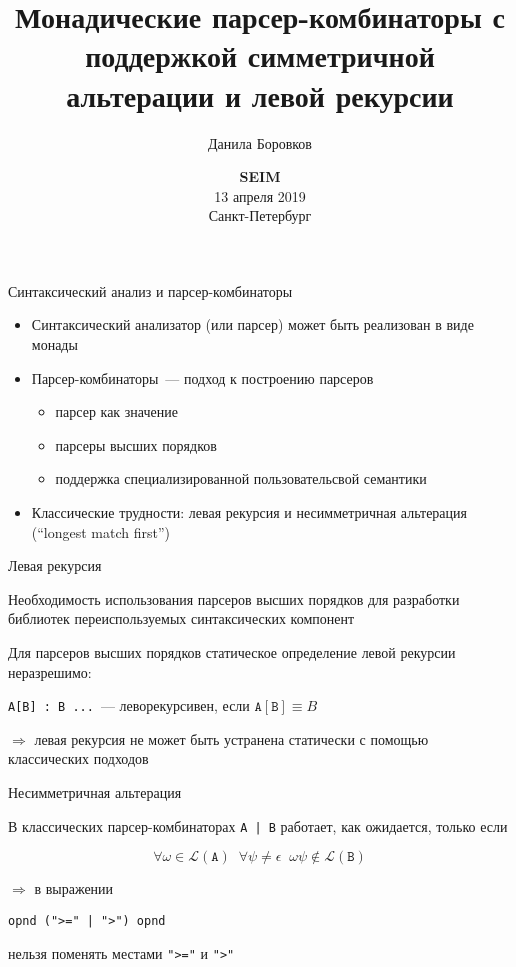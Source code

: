 \documentclass[10pt, mathserif]{beamer}
\title{Монадические парсер-комбинаторы с поддержкой симметричной альтерации и левой рекурсии}
\author{Данила Боровков}
\date{
   \vskip 3cm
   \small{
   \textbf{SEIM}\\
   13 апреля 2019 \\
   Санкт-Петербург}
}
\theoremstyle{definition}
\begin{document}
\begin{frame}
  \titlepage
\end{frame}

\begin{frame}[fragile]{Синтаксический анализ и парсер-комбинаторы}
  \begin{itemize}
    \item Синтаксический анализатор (или парсер) может быть реализован в виде монады
    \item Парсер-комбинаторы~--- подход к построению парсеров
      \begin{itemize}
         \item парсер как значение
         \item парсеры высших порядков
         \item поддержка специализированной пользовательсвой семантики
      \end{itemize}
   \item Классические трудности: левая рекурсия и несимметричная альтерация (``longest match first'')
  \end{itemize}
\end{frame}

\begin{frame}[fragile]{Левая рекурсия}

  Необходимость использования парсеров высших порядков для разработки библиотек переиспользуемых
  синтаксических компонент
  \vskip3mm

  Для парсеров высших порядков статическое определение левой рекурсии неразрешимо:
  \vskip3mm

  \begin{center}
    \texttt{A[B] : B ...}~--- леворекурсивен, если $\mathtt{A[B]} \equiv B$
  \end{center}
  \vskip3mm

  $\Rightarrow$ левая рекурсия не может быть устранена статически с помощью классических подходов

\end{frame}

\begin{frame}[fragile]{Несимметричная альтерация}

  В классических парсер-комбинаторах \texttt{A | B} работает, как ожидается, только если

  \[
  \forall\omega\in{\mathscr L}(\mathtt{A})\;\;\forall\psi\not=\epsilon\;\;\omega\psi\not\in{\mathscr L}(\mathtt{B})
  \]


  $\Rightarrow$ в выражении

  \begin{center}
    \verb/opnd (">=" | ">") opnd/
  \end{center}

  нельзя поменять местами \verb/">="/ и \verb/">"/

\end{frame}
\end{document}
